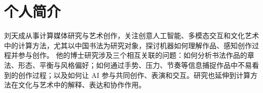 \section*{个人简介}
刘天成从事计算媒体研究与艺术创作，关注创意人工智能、多模态交互和文化艺术中的计算方法，尤其以中国书法为研究对象，探讨机器如何理解作品、感知创作过程并参与创作。
他的博士研究涉及三个相互关联的问题：如何分析书法作品的章法、形态、平衡与风格偏好；如何通过手势、压力、节奏等信息捕捉作品中不易看到的创作过程；以及如何让 AI 参与共同创作、表演和交互。研究也延伸到计算方法在文化与艺术中的解释、表达和协作作用。
